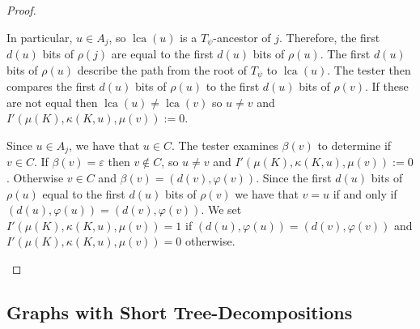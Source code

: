 \documentclass{patmorin}
\renewcommand{\le}{\leqslant}
\newcommand{\pat}[1]{\noindent\textcolor{Magenta}{PaMo: #1}}
\newcommand{\piotr}[1]{\noindent\textcolor{red}{PiMi: #1}}
\DeclareMathOperator{\lca}{lca}
\begin{document}
\begin{proof}
\begin{itemize}




       In particular, $u\in A_j$, so $\lca(u)$ is a $T_\psi$-ancestor of $j$.   Therefore, the first $d(u)$ bits of $\rho(j)$ are equal to the first $d(u)$ bits of $\rho(u)$.  The first $d(u)$ bits of $\rho(u)$ describe the path from the root of $T_\psi$ to $\lca(u)$.  The tester then compares the first $d(u)$ bits of $\rho(u)$ to the first $d(u)$ bits of $\rho(v)$.  If these are not equal then $\lca(u)\neq\lca(v)$ so $u\neq v$ and $I'(\mu(K),\kappa(K,u),\mu(v)):=0$.

       Since $u\in A_j$, we have that $u\in C$.  The tester examines $\beta(v)$ to determine if $v\in C$.  If $\beta(v)=\varepsilon$ then $v\not\in C$, so $u\neq v$ and $I'(\mu(K),\kappa(K,u),\mu(v)):=0$. Otherwise $v\in C$ and $\beta(v)=(d(v),\varphi(v))$. Since the first $d(u)$ bits of $\rho(u)$ equal to the first $d(u)$ bits of $\rho(v)$ we have that $v=u$ if and only if $(d(u),\varphi(u))=(d(v),\varphi(v))$.
       We set $I'(\mu(K),\kappa(K,u),\mu(v))=1$ if $(d(u),\varphi(u))=(d(v),\varphi(v))$ and $I'(\mu(K),\kappa(K,u),\mu(v))=0$ otherwise.
     \end{itemize}
  \end{proof}



\subsection{Graphs with Short Tree-Decompositions}

\end{document}

